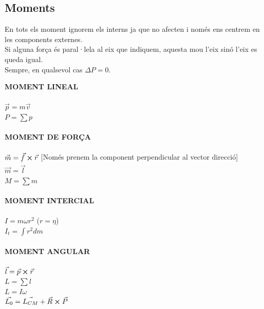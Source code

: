 \documentclass[11pt]{article}
\begin{document}
\subsection{Moments}

En tots els moment ignorem els interns ja que no afecten i només ens centrem en les components externes.\\

\noindent Si alguna força és paral·lela al eix que indiquem, aquesta mou l'eix sinó l'eix es queda igual.\\

\noindent Sempre, en qualsevol cas $\Delta P = 0$.

\begin{tcolorbox}[
  title=Fórmues bàsiques,
  colback=MidnightBlue!5!white,
  colframe=MidnightBlue!70!black,
  coltitle=white,
  colbacktitle=MidnightBlue!70!black,
  fonttitle=\bfseries,
  arc=6pt,
  boxrule=0.8pt
]

\textbf{MOMENT LINEAL}\\ 
\\
$\vec{p} = m \vec{v}$\\
$P = \sum p$\\
\\
\textbf{MOMENT DE FORÇA}\\
\\
$\vec{m} = \vec{f} \cross \vec{r}$ [Només prenem la component perpendicular al vector direcció]\\
$\vec{m} = \dot{\vec{l}}$\\
$M = \sum m$\\
\\
\textbf{MOMENT INTERCIAL}\\
\\
$I = m\omega r^2$ ($r = \eta$)\\
$I_t = \int r^2 dm$\\
\\
\textbf{MOMENT ANGULAR}\\ 
\\
$\vec{l} = \vec{p} \cross \vec{r}$\\
$L = \sum l$\\
$L = I \omega$\\
$\vec{L_0} = \vec{L_{CM}} + \vec{R} \cross \vec{P}$\\

\end{tcolorbox}
\end{document}
